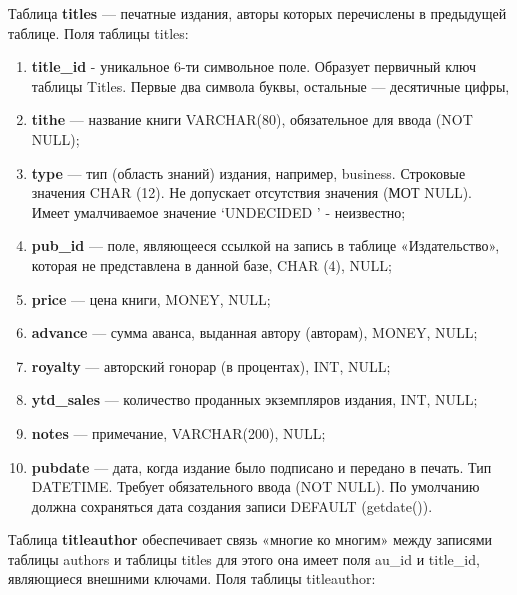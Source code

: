 Таблица \textbf{titles} — печатные издания, авторы которых перечислены в предыдущей таблице. Поля таблицы titles:
\begin{enumerate}
\item \textbf{title\_id} - уникальное 6-ти символьное поле. Образует первичный ключ таблицы Titles. Первые два символа буквы, остальные — десятичные цифры,

\item \textbf{tithe} — название книги VARCHAR(80), обязательное для ввода (NOT NULL);

\item \textbf{type} — тип (область знаний) издания, например, business. Строковые значения CHAR (12). Не допускает отсутствия значения (МОТ NULL). Имеет умалчиваемое значение ‘UNDECIDED ' - неизвестно;

\item \textbf{pub\_id} — поле, являющееся ссылкой на запись в таблице «Издательство», которая не представлена в данной базе, CHAR (4), NULL;

\item \textbf{price} — цена книги, MONEY, NULL;

\item \textbf{advance} — сумма аванса, выданная автору (авторам), MONEY, NULL;

\item \textbf{royalty} — авторский гонорар (в процентах), INT, NULL;

\item \textbf{ytd\_sales} — количество проданных экземпляров издания, INT, NULL;

\item \textbf{notes} — примечание, VARCHAR(200), NULL;

\item \textbf{pubdate} — дата, когда издание было подписано и передано в печать. Тип DATETIME. Требует обязательного ввода (NOT NULL). По умолчанию должна сохраняться дата создания записи DEFAULT (getdate()).
\end{enumerate}

Таблица \textbf{titleauthor} обеспечивает связь «многие ко многим» между записями таблицы authors и таблицы titles для этого она имеет поля au\_id и title\_id, являющиеся внешними ключами. Поля таблицы titleauthor:

